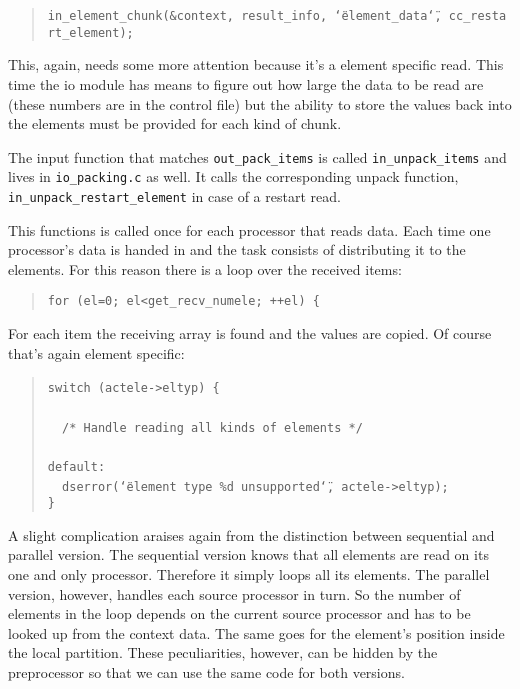 \begin{quote}
\texttt{in{\_}element{\_}chunk({\&}context,~result{\_}info,~\char`\"{}element{\_}data\char`\"{},~cc{\_}restart{\_}element); }
\end{quote}
This, again, needs some more attention because it's a element specific
read. This time the io module has means to figure out how large the
data to be read are (these numbers are in the control file) but the
ability to store the values back into the elements must be provided
for each kind of chunk.

The input function that matches \texttt{out{\_}pack{\_}items}
is called \texttt{in{\_}unpack{\_}items} and lives in \texttt{io{\_}packing.c}
as well. It calls the corresponding unpack function, \texttt{in{\_}unpack{\_}restart{\_}element}
in case of a restart read.

This functions is called once for each processor that reads data.
Each time one processor's data is handed in and the task consists
of distributing it to the elements. For this reason there is a loop
over the received items: 

\begin{quote}
\texttt{for~(el=0;~el<get{\_}recv{\_}numele;~++el)~{\{} }
\end{quote}
For each item the receiving array is found and the values are copied.
Of course that's again element specific: 

\begin{quote}
\texttt{switch~(actele->eltyp)~{\{}~}~\\
 \texttt{~}~\\
 \texttt{~~/{*}~Handle~reading~all~kinds~of~elements~{*}/~}~\\
 \texttt{~}~\\
 \texttt{default:~}~\\
 \texttt{~~dserror(\char`\"{}element~type~{\%}d~unsupported\char`\"{},~actele->eltyp);~}~\\
 \texttt{{\}} }
\end{quote}
A slight complication araises again from the distinction between sequential
and parallel version. The sequential version knows that all elements
are read on its one and only processor. Therefore it simply loops
all its elements. The parallel version, however, handles each source
processor in turn. So the number of elements in the loop depends on
the current source processor and has to be looked up from the context
data. The same goes for the element's position inside the local partition.
These peculiarities, however, can be hidden by the preprocessor so
that we can use the same code for both versions.


